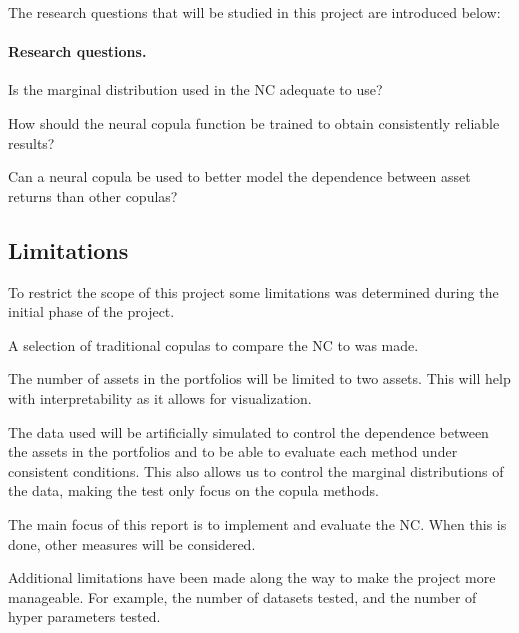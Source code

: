 The research questions that will be studied in this project are introduced below:
\paragraph*{Research questions.}
\begin{compactenum}[{\bfseries RQ}1]
    \item \label{item:RQ1} Is the marginal distribution used in the \gls{NC} adequate to use?
    \item \label{item:RQ2} How should the neural copula function be trained to obtain consistently reliable results?
    \item \label{item:RQ3} Can a neural copula be used to better model the dependence between asset returns than other copulas?
\end{compactenum}
\newcommand{\RQone}{{\bfseries RQ}\ref{item:RQ1}}
\newcommand{\RQtwo}{{\bfseries RQ}\ref{item:RQ2}}
\newcommand{\RQthree}{{\bfseries RQ}\ref{item:RQ3}}




\subsection{Limitations}\label{Limitations}
To restrict the scope of this project some limitations was determined during the initial phase of the project.

\begin{compactenum}
    \item A selection of traditional copulas to compare the \gls{NC} to was made. 
    \item The number of assets in the portfolios will be limited to two assets. This will help with interpretability as it allows for visualization. 
    \item The data used will be artificially simulated to control the dependence between the assets in the portfolios and to be able to evaluate each method under consistent conditions. This also allows us to control the marginal distributions of the data, making the test only focus on the copula methods.  
    \item The main focus of this report is to implement and evaluate the \gls{NC}. When this is done, other measures will be considered. 
\end{compactenum}
Additional limitations have been made along the way to make the project more manageable. For example, the number of datasets tested, and the number of hyper parameters tested.  

